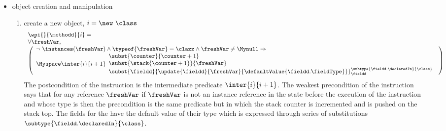 \begin{itemize}

\item  object creation and manipulation 
	\begin{enumerate}
		\item create a new object, $ i = \new  \ \class $ \\
		$$ \begin{array}{l}
                         \wpi{} {\methodd}{i}  =  \\
		 
		    \forall \freshVar,\\
                    \left(\begin{array}{l}  \neg \ \instances(\freshVar) \wedge
		     \typeof{\freshVar} = \clazz \wedge
		    \freshVar \neq \Mynull  \Rightarrow \\
		      
			                 \Myspace   %
					
                                    \inter{i}{i+1} \begin{array}{l}
		                                   \subst{ \counter}{ \counter + 1 } \\
						   \subst{ \stack{ \counter + 1} }{\freshVar} \\
						   \subst{ \fieldd} { \update{\fieldd} { \freshVar }{\defaultValue{ \fieldd.  \fieldType } } }_{{\small \fieldd}}^{{\small \subtype{\fieldd.\declaredIn}{  \class}} } \\
		       \end{array} 
                  \end{array} \right)
              \end{array}$$
		  The postcondition of the instruction \new{} is the intermediate predicate $\inter{i}{i+1}$. The weakest precondition 
		  of the instruction says that for any reference $\freshVar$ 
		  if $\freshVar$ is not an instance reference  in the state before the execution of the instruction and whose type is \class{}  then
		  the precondition is the same predicate but in which the stack
		  counter is incremented and \freshVar{}  is pushed on the stack top. The fields for the 
		  \freshVar{} have the default value of their type which is expressed through series of substitutions ${\small \subtype{\fieldd.\declaredIn}{  \class}}  $. 
	

\end{enumerate}
\end{itemize}
